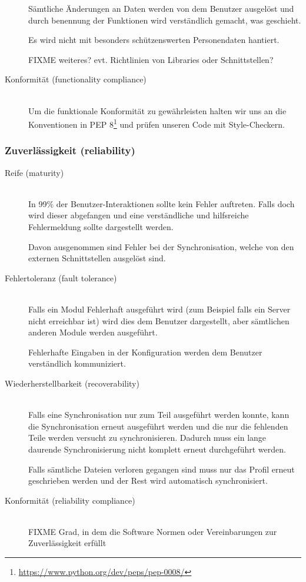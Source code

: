 \documentclass[a4paper]{article}
\begin{document}
\begin{description}
    Sämtliche Änderungen an Daten werden von dem Benutzer ausgelöst und durch benennung der Funktionen wird verständlich gemacht, was geschieht.

    Es wird nicht mit besonders schützenswerten Personendaten hantiert.

    FIXME weiteres? evt. Richtlinien von Libraries oder Schnittstellen?
  \item[Konformität (functionality compliance)] \strut \\
    Um die funktionale Konformität zu gewährleisten halten wir uns an die Konventionen in PEP 8\footnote{\url{https://www.python.org/dev/peps/pep-0008/}} und prüfen unseren Code mit Style-Checkern.
\end{description}

\subsubsection{Zuverlässigkeit (reliability)}

\begin{description}
  \item[Reife (maturity)] \strut \\
    In 99\% der Benutzer-Interaktionen sollte kein Fehler auftreten.
    Falls doch wird dieser abgefangen und eine verständliche und hilfsreiche Fehlermeldung sollte dargestellt werden.

    Davon ausgenommen sind Fehler bei der Synchronisation, welche von den externen Schnittstellen ausgelöst sind.
  \item[Fehlertoleranz (fault tolerance)] \strut \\
    Falls ein Modul Fehlerhaft ausgeführt wird (zum Beispiel falls ein Server nicht erreichbar ist) wird dies dem Benutzer dargestellt, aber sämtlichen anderen Module werden ausgeführt.

    Fehlerhafte Eingaben in der Konfiguration werden dem Benutzer verständlich kommuniziert.
  \item[Wiederherstellbarkeit (recoverability)] \strut \\
    Falls eine Synchronisation nur zum Teil ausgeführt werden konnte, kann die Synchronisation erneut ausgeführt werden und die nur die fehlenden Teile werden versucht zu synchronisieren.
    Dadurch muss ein lange daurende Synchronisierung nicht komplett erneut durchgeführt werden.

    Falls sämtliche Dateien verloren gegangen sind muss nur das Profil erneut geschrieben werden und der Rest wird automatisch synchronisiert.
  \item[Konformität (reliability compliance)] \strut \\
    FIXME Grad, in dem die Software Normen oder Vereinbarungen zur Zuverlässigkeit erfüllt
\end{description}
\end{document}
